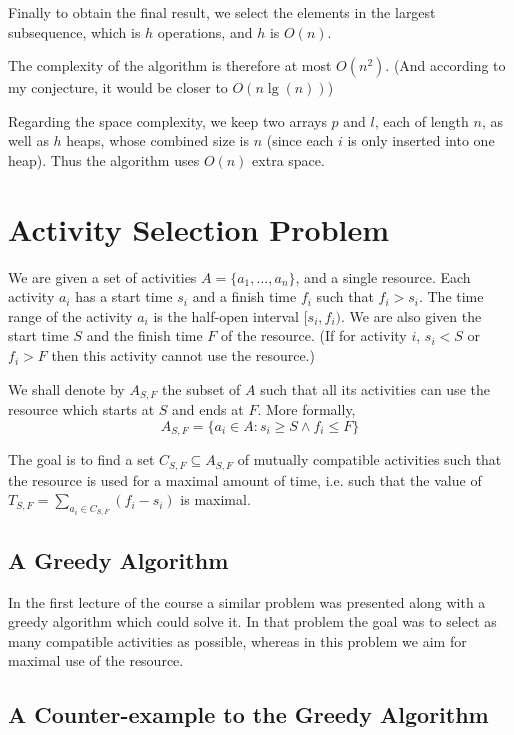 \documentclass{article}
\begin{document}
Finally to obtain the final result, we select the elements in the largest subsequence, which is \(h\) operations, and \(h\) is \(O(n)\).

The complexity of the algorithm is therefore at most \(O(n^2)\). (And according to my conjecture, it would be closer to \(O(n\lg(n))\))

Regarding the space complexity, we keep two arrays \(p\) and \(l\), each of length \(n\), as well as \(h\) heaps, whose combined size is \(n\) (since each \(i\) is only inserted into one heap). Thus the algorithm uses \(O(n)\) extra space.

\section{Activity Selection Problem}

We are given a set of activities \(A = \{a_1, \dots, a_n\}\), and a single resource. Each activity \(a_i\) has a start time \(s_i\) and a finish time \(f_i\) such that \(f_i > s_i\). The time range of the activity \(a_i\) is the half-open interval \([s_i, f_i)\). We are also given the start time \(S\) and the finish time \(F\) of the resource. (If for activity \(i\), \(s_i < S\) or \(f_i > F\) then this activity cannot use the resource.)

We shall denote by \(A_{S,F}\) the subset of \(A\) such that all its activities can use the resource which starts at \(S\) and ends at \(F\). More formally,
\begin{equation*}
	A_{S,F} = \{a_i \in A : s_i \geq S \land f_i \leq F\}
\end{equation*}

The goal is to find a set \(C_{S,F} \subseteq A_{S,F}\) of mutually compatible activities such that the resource is used for a maximal amount of time, i.e. such that the value of \(T_{S,F} = \sum_{a_i \in C_{S,F}}(f_i - s_i)\) is maximal.

\subsection{A Greedy Algorithm}

In the first lecture of the course a similar problem was presented along with a greedy algorithm which could solve it. In that problem the goal was to select as many compatible activities as possible, whereas in this problem we aim for maximal use of the resource.

\subsection{A Counter-example to the Greedy Algorithm}
\end{document}
